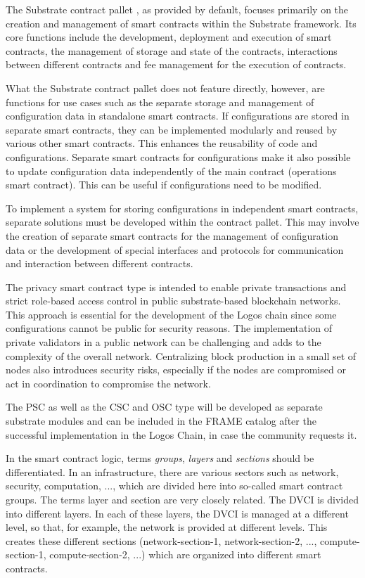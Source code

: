 \documentclass[]{article}
\begin{document}
The Substrate contract pallet \cite{Parity-docs-npos}, as provided by default, focuses primarily on the creation and management of smart contracts within the Substrate framework. 
Its core functions include the development, deployment and execution of smart contracts, the management of storage and state of the contracts, interactions between different contracts and fee management for the execution of contracts. 

What the Substrate contract pallet does not feature directly, however, are functions for use cases such as the separate storage and management of configuration data in standalone smart contracts.
If configurations are stored in separate smart contracts, they can be implemented modularly and reused by various other smart contracts. This enhances the reusability of code and configurations.
Separate smart contracts for configurations make it also possible to update configuration data independently of the main contract (operations smart contract). 
This can be useful if configurations need to be modified.

To implement a system for storing configurations in independent smart contracts, separate solutions must be developed within the contract pallet. 
This may involve the creation of separate smart contracts for the management of configuration data or the development of special interfaces and protocols for communication and interaction between different contracts.

The privacy smart contract type is intended to enable private transactions and strict role-based access control in public substrate-based blockchain networks.
This approach is essential for the development of the Logos chain since some configurations cannot be public for security reasons.
The implementation of private validators in a public network can be challenging and adds to the complexity of the overall network.
Centralizing block production in a small set of nodes also introduces security risks, especially if the nodes are compromised or act in coordination to compromise the network.

The PSC as well as the CSC and OSC type will be developed as separate substrate modules and can be included in the FRAME catalog after the successful implementation in the Logos Chain, in case the community requests it.  

In the smart contract logic, terms \textit{groups}, \textit{layers} and \textit{sections} should be differentiated.
In an infrastructure, there are various sectors such as network, security, computation, ..., which are divided here into so-called smart contract groups.
The terms layer and section are very closely related. 
The DVCI is divided into different layers. 
In each of these layers, the DVCI is managed at a different level, so that, for example, the network is provided at different levels.
This creates these different sections (network-section-1, network-section-2, ..., compute-section-1, compute-section-2, ...) which are organized into different smart contracts.
\end{document}
